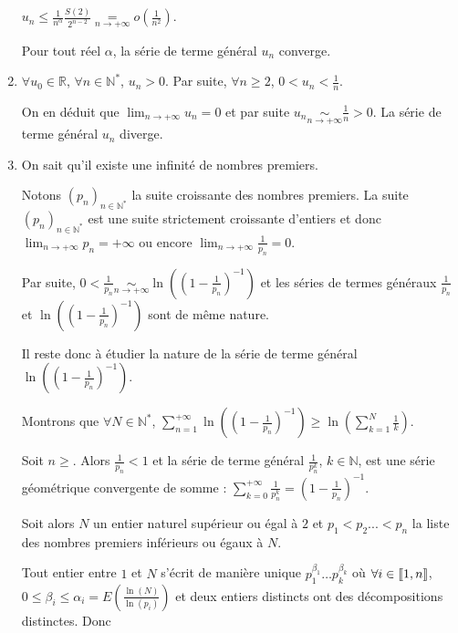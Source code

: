 \documentclass[11pt,a4paper]{article}
\newcommand{\Nn}{\mathbb{N}} \newcommand{\N}{\mathbb{N}}
\newcommand{\Rr}{\mathbb{R}} \newcommand{\R}{\mathbb{R}}
\newcommand{\llbracket}{\left[\kern-0.15em\left[}
\newcommand{\rrbracket}{\right]\kern-0.15em\right]}
\begin{document}
\begin{enumerate}
\begin{center}
$u_n\leqslant\frac{1}{n^\alpha}\frac{S(2)}{2^{n-2}}\underset{n\rightarrow+\infty}{=}o\left(\frac{1}{n^2}\right)$.
\end{center}

Pour tout réel $\alpha$, la série de terme général $u_n$ converge.

\item  $\forall u_0\in\Rr$, $\forall n\in\Nn^*$, $u_n > 0$. Par suite, $\forall n\geqslant 2$, $0< u_n<\frac{1}{n}$.

On en déduit que $\lim_{n \rightarrow +\infty}u_n=0$ et par suite $u_n\underset{n\rightarrow+\infty}{\sim}\frac{1}{n}>0$. La série de terme général $u_n$ diverge.

\item  On sait qu'il existe une infinité de nombres premiers.

Notons $(p_n)_{n\in\Nn^*}$ la suite croissante des nombres premiers. La suite $(p_n)_{n\in\Nn^*}$ est une suite strictement croissante d'entiers et donc $\lim_{n \rightarrow +\infty}p_n= +\infty$ ou encore $\lim_{n \rightarrow +\infty}\frac{1}{p_n}=0$.

Par suite, $0<\frac{1}{p_n}\underset{n\rightarrow+\infty}{\sim}\ln\left(\left(1-\frac{1}{p_n}\right)^{-1}\right)$ et les séries de termes généraux $\frac{1}{p_n}$ et $\ln\left(\left(1-\frac{1}{p_n}\right)^{-1}\right)$ sont de même nature.

Il reste donc à étudier la nature de la série de terme général $\ln\left(\left(1-\frac{1}{p_n}\right)^{-1}\right)$.

Montrons que $\forall N\in\Nn^*$,  $\sum_{n=1}^{+\infty}\ln\left(\left(1-\frac{1}{p_n}\right)^{-1}\right)\geqslant\ln\left(\sum_{k=1}^{N}\frac{1}{k}\right)$.

Soit $n\geqslant$. Alors $\frac{1}{p_n}<1$ et la série de terme général $\frac{1}{p_n^k}$, $k\in\Nn$, est une série géométrique convergente de somme : $\sum_{k=0}^{+\infty}\frac{1}{p_n^k}= \left(1-\frac{1}{p_n}\right)^{-1}$.

Soit alors $N$ un entier naturel supérieur ou égal à $2$ et $p_1 < p_2... < p_n$ la liste des nombres premiers inférieurs ou égaux à $N$.

Tout entier entre $1$ et $N$ s'écrit de manière unique $p_1^{\beta_1}\ldots p_k^{\beta_k}$ où $\forall i\in\llbracket1,n\rrbracket$, $0\leqslant\beta_i\leqslant\alpha_i=E\left(\frac{\ln(N)}{\ln(p_i)}\right)$ et deux entiers distincts ont des décompositions distinctes. Donc


\end{enumerate}
\end{document}
